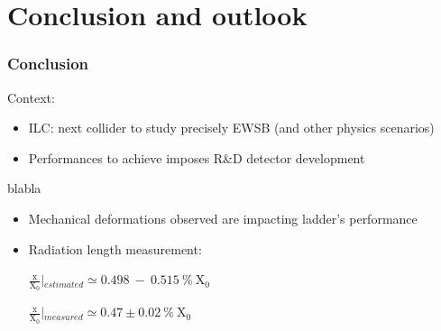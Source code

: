 \documentclass{beamer}
\begin{document}
    
  \section{Conclusion and outlook} 

  \begin{frame}
    \frametitle{Conclusion}

    \begin{block}{Context:}
      \begin{itemize}
        \item ILC: next collider to study precisely EWSB (and other physics scenarios)
        \item Performances to achieve imposes R\&D detector development
      \end{itemize}
    \end{block}

    \begin{block}{blabla}
      \begin{itemize}
        \item Mechanical deformations observed are impacting ladder's performance
        \item Radiation length measurement: 
        \begin{center}
          $\frac{\text{x}}{\text{X}_0}\left|_{estimated} \simeq 0.498~-~0.515~\%~\text{X}_0 \right.$

          $\frac{\text{x}}{\text{X}_0}\left|_{measured} \simeq 0.47 \pm 0.02~\%~\text{X}_0 \right.$
        \end{center}
      \end{itemize}
    \end{block}



  \end{frame}
\end{document}
